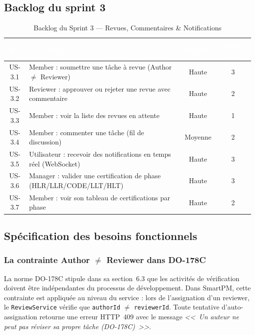 \subsection{Backlog du sprint 3}

\begin{table}[H]
\centering
\renewcommand{\arraystretch}{1.4}
\begin{tabularx}{\textwidth}{|c|X|c|c|}
\hline
\rowcolor{tablehead}
\textcolor{white}{\textbf{ID}} &
\textcolor{white}{\textbf{User Story}} &
\textcolor{white}{\textbf{Priorit\'e}} &
\textcolor{white}{\textbf{Charge (j)}} \\ \hline
US-3.1 & Member : soumettre une t\^ache \`a revue (Author $\neq$ Reviewer) & Haute & 3 \\ \hline
US-3.2 & Reviewer : approuver ou rejeter une revue avec commentaire & Haute & 2 \\ \hline
US-3.3 & Member : voir la liste des revues en attente & Haute & 1 \\ \hline
US-3.4 & Member : commenter une t\^ache (fil de discussion) & Moyenne & 2 \\ \hline
US-3.5 & Utilisateur : recevoir des notifications en temps r\'eel (WebSocket) & Haute & 3 \\ \hline
US-3.6 & Manager : valider une certification de phase (HLR/LLR/CODE/LLT/HLT) & Haute & 3 \\ \hline
US-3.7 & Member : voir son tableau de certifications par phase & Haute & 2 \\ \hline
\end{tabularx}
\caption{Backlog du Sprint 3 --- Revues, Commentaires \& Notifications}
\label{tab:backlog_s3}
\end{table}

\subsection{Sp\'ecification des besoins fonctionnels}

\subsubsection{La contrainte Author $\neq$ Reviewer dans DO-178C}

La norme DO-178C stipule dans sa section~6.3 que les activit\'es de
v\'erification doivent \^etre ind\'ependantes du processus de d\'eveloppement.
Dans SmartPM, cette contrainte est appliqu\'ee au niveau du service :
lors de l'assignation d'un reviewer, le \texttt{ReviewService} v\'erifie
que \texttt{authorId} $\neq$ \texttt{reviewerId}. Toute tentative
d'auto-assignation retourne une erreur HTTP~409 avec le message
\textit{<<~Un auteur ne peut pas r\'eviser sa propre t\^ache (DO-178C)~>>}.

